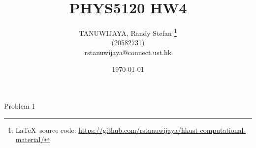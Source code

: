 \documentclass{article}
\title{PHYS5120 HW4}
\author{TANUWIJAYA, Randy Stefan \footnote{\LaTeX\ source code: \url{https://github.com/rstanuwijaya/hkust-computational-material/}}\\ (20582731) \\ rstanuwijaya@connect.ust.hk}
\affil{Department of Physics - HKUST}
\date{\today}
\begin{document}
	\maketitle
	\begin{section}{Problem 1}
		\begin{tcolorbox}
		\end{tcolorbox}
	\end{section}
\end{document}
